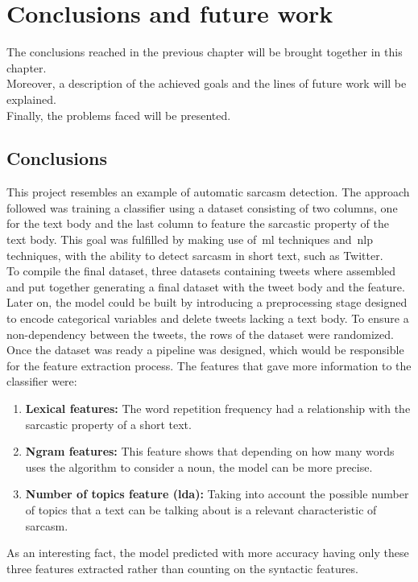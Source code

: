 \chapter{Conclusions and future work}
\label{chap:conclusions}
The conclusions reached in the previous chapter will be brought together in this chapter.\\
Moreover, a description of the achieved goals and the lines of future work will be explained.\\
Finally, the problems faced will be presented.

\section{Conclusions}
\label{sec:conclusions}
This project resembles an example of automatic sarcasm detection. The approach followed was training a classifier using a dataset consisting of two columns, one for the text body and the last column to feature the sarcastic property of the text body. This goal was fulfilled by making use of~\ac{ml} techniques and~\ac{nlp} techniques, with the ability to detect sarcasm in short text, such as Twitter.\\
To compile the final dataset, three datasets containing tweets where assembled and put together generating a final dataset with the tweet body and the feature.\\
Later on, the model could be built by introducing a preprocessing stage designed to encode categorical variables and delete tweets lacking a text body. To ensure a non-dependency between the tweets, the rows of the dataset were randomized.\\
Once the dataset was ready a pipeline was designed, which would be responsible for the feature extraction process. The features that gave more information to the classifier were:
\begin{enumerate}
	\item \textbf{Lexical features:} The word repetition frequency had a relationship with the sarcastic property of a short text.
	\item \textbf{Ngram features:} This feature shows that depending on how many words uses the algorithm to consider a noun, the model can be more precise.
	\item \textbf{Number of topics feature (\ac{lda}):} Taking into account the possible number of topics that a text can be talking about is a relevant characteristic of sarcasm.
\end{enumerate} 
As an interesting fact, the model predicted with more accuracy having only these three features extracted rather than counting on the syntactic features.\\
